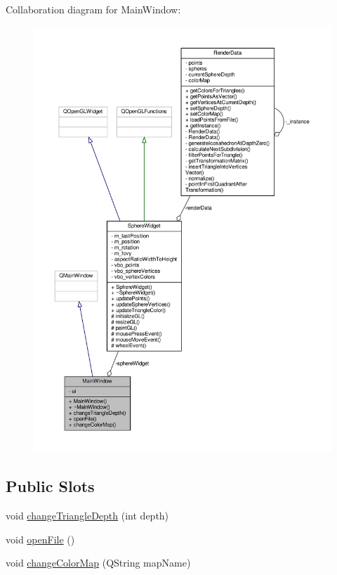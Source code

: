 Collaboration diagram for Main\+Window\+:
\nopagebreak
\begin{figure}[H]
\begin{center}
\leavevmode
\includegraphics[width=350pt]{class_main_window__coll__graph}
\end{center}
\end{figure}
\subsection*{Public Slots}
\begin{DoxyCompactItemize}
\item 
void \hyperlink{class_main_window_a7bdf36376a7474c5218923ed66baa937}{change\+Triangle\+Depth} (int depth)
\item 
void \hyperlink{class_main_window_a288b768c3c21a9171bdc56fe845ece8b}{open\+File} ()
\item 
void \hyperlink{class_main_window_a1cfcf14a3dbba8db45a2444a0fbe5a9f}{change\+Color\+Map} (Q\+String map\+Name)
\end{DoxyCompactItemize}
